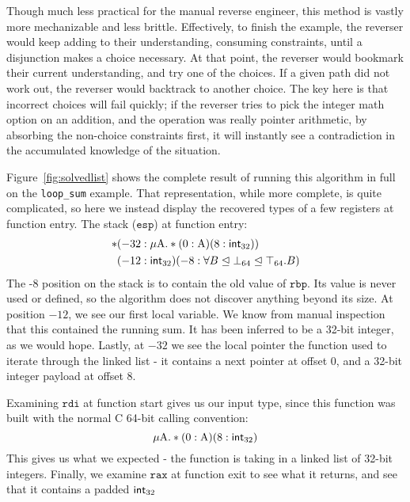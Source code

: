 Though much less practical for the manual reverse engineer, this method is vastly more mechanizable and less brittle. Effectively, to finish the example, the reverser would keep adding to their understanding, consuming constraints, until a disjunction makes a choice necessary. At that point, the reverser would bookmark their current understanding, and try one of the choices. If a given path did not work out, the reverser would backtrack to another choice. The key here is that incorrect choices will fail quickly; if the reverser tries to pick the integer math option on an addition, and the operation was really pointer arithmetic, by absorbing the non-choice constraints first, it will instantly see a contradiction in the accumulated knowledge of the situation.

Figure~\ref{fig:solvedlist} shows the complete result of running this algorithm in full on the \texttt{loop\_sum} example. That representation, while more complete, is quite complicated, so here we instead display the recovered types of a few registers at function entry. The stack ($\texttt{esp}$) at function entry:
\begin{align*}
*&(-32 : \mu \textrm{A}. *(0:\textrm{A})(8:\mathsf{int}_{32}))\\
&(-12 : \mathsf{int}_{32})(-8:\forall B\mathrel{\unlhd} \bot_{64}\mathrel{\unlhd} \top_{64}.B)
\end{align*}
The -8 position on the stack is to contain the old value of $\texttt{rbp}$. Its value is never used or defined, so the algorithm does not discover anything beyond its size. At position $-12$, we see our first local variable. We know from manual inspection that this contained the running sum. It has been inferred to be a 32-bit integer, as we would hope. Lastly, at $-32$ we see the local pointer the function used to iterate through the linked list - it contains a next pointer at offset 0, and a 32-bit integer payload at offset 8.

Examining $\texttt{rdi}$ at function start gives us our input type, since this function was built with the normal C 64-bit calling convention:
$$\mu \textrm{A}. *(0:\textrm{A})(8:\mathsf{int}_{32})$$
This gives us what we expected - the function is taking in a linked list of 32-bit integers. Finally, we examine $\texttt{rax}$ at function exit to see what it returns, and see that it contains a padded $\mathsf{int}_{32}$
